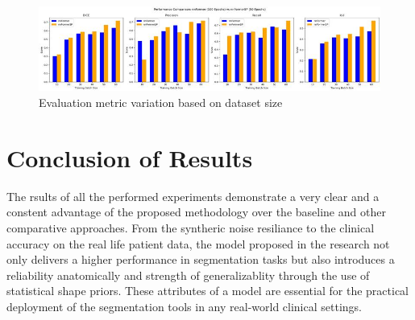 \begin{figure}[htb!]  %
    \centering
	\centering
	\includegraphics[width=1\textwidth]{images/datasets.jpeg}
	\caption{\centering Evaluation metric variation based on dataset size}
	\label{Fig:datasets}
\end{figure}

\section{Conclusion of Results}
The rsults of all the performed experiments demonstrate a very clear and a constent advantage of the proposed methodology over the baseline and other comparative approaches. From the syntheric noise resiliance to the clinical accuracy on the real life patient data, the model proposed in the research not only delivers a higher performance in segmentation tasks but also introduces a reliability anatomically and strength of generalizablity through the use of statistical shape priors. These attributes of a model are essential for the practical deployment of the segmentation tools in any real-world clinical settings.